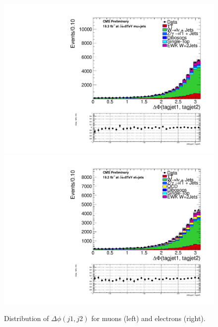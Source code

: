 \begin{figure}[ht]
\centerline{
      \includegraphics[width=.49\textwidth]{figs/n-1_plots_mu/mu_EWK_W_2jets_tagjet_deltaphi_mjj_600_tagjet1_60_tagjet2_50_Zeppenfield_1point2_EWKW2jets.pdf}
      \includegraphics[width=.49\textwidth]{figs/n-1_plots_el/el_EWK_W_2jets_tagjet_deltaphi_mjj_600_tagjet1_60_tagjet2_50_Zeppenfield_1point2_met_30_WmT_30_EWKW2jets.pdf}
}
\caption{Distribution of $\Delta \phi(j1,j2)$ for muons (left) and electrons (right).}
\label{fig:deltaphij1j2}
\end{figure}

